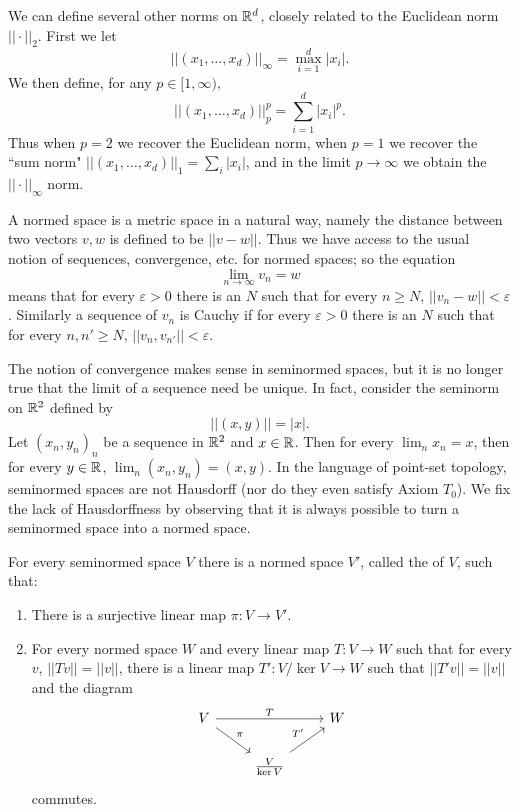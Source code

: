 \begin{example}
We can define several other norms on $\mathbb{R}^d$, closely related to the Euclidean norm $||\cdot||_2$. First we let
\[||(x_1, \dots, x_d)||_{\infty} = \max_{i=1}^{d} |x_i|.\]
We then define, for any $p \in [1, \infty),$
\[||(x_1, \dots, x_d)||_{p} ^{p} = \sum_{i=1}^{d} |x_i|^p.\]
Thus when $p = 2$ we recover the Euclidean norm, when $p = 1$ we recover the ``sum norm" $||(x_1, \dots, x_d)||_1 = \sum_{i} |x_i|$, and in the limit $p \to \infty$ we obtain the $||\cdot||_\infty$ norm.
\end{example}

\begin{subsec}
A normed space is a metric space in a natural way, namely the distance between two vectors $v,w$ is defined to be $||v - w||$.
Thus we have access to the usual notion of sequences, convergence, etc. for normed spaces; so the equation
\[\lim_{n \to \infty} v_{n} = w\]
means that for every $\varepsilon > 0$ there is an $N$ such that for every $n \geq N$, $||v_{n} - w|| < \varepsilon$.
Similarly a sequence of $v_{n}$ is Cauchy if for every $\varepsilon > 0$ there is an $N$ such that for every $n, n' \geq N$, $||v_{n}, v_{n'}|| < \varepsilon$.
\end{subsec}

\begin{subsec}
The notion of convergence makes sense in seminormed spaces, but it is no longer true that the limit of a sequence need be unique.
In fact, consider the seminorm on $\mathbb{R}^2$ defined by
\[||(x, y)|| = |x|.\]
Let $(x_{n}, y_{n})_{n}$ be a sequence in $\mathbb{R}^2$ and $x \in \mathbb{R}$. Then for every $\lim_{n} x_{n} = x$, then for every $y \in \mathbb{R}$, $\lim_{n} (x_{n}, y_{n}) = (x, y)$.
In the language of point-set topology, seminormed spaces are not Hausdorff (nor do they even satisfy Axiom $T_0$).
We fix the lack of Hausdorffness by observing that it is always possible to turn a seminormed space into a normed space.
\end{subsec}

\begin{theorem}
\label{existence of normalization}
For every seminormed space $V$ there is a normed space $V'$, called the  of $V$, such that:
\begin{enumerate}
\item There is a surjective linear map $\pi: V \to V'$.
\item For every normed space $W$ and every linear map $T: V \to W$ such that for every $v$, $||Tv|| = ||v||$, there is a linear map $T': V/\ker V \to W$ such that $||T'v|| = ||v||$ and the diagram
\begin{equation}
\label{normification universal}
\begin{tikzcd}
V \arrow[rr,"T"] \arrow[dr,"\pi"] && W\\
& \frac{V}{\ker V} \arrow[ur,"T'"]
\end{tikzcd}
\end{equation}
commutes.
\end{enumerate}
\end{theorem}

